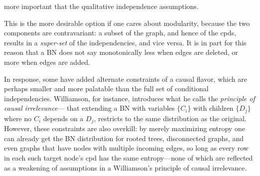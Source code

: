 \documentclass[letterpaper]{article} %
\theoremstyle{plain}
\theoremstyle{definition}
\theoremstyle{remark}
\newcommand{\commentout}[1]{\ignorespaces}
\begin{document}
{        more important that the qualitative independence assumptions.  
\begin{vfull}
	This is the more desirable option if one cares about
	modularity, because the two components are contravariant: a subset of
	the graph, and hence of the cpds, results in a \emph{super-set} of
	the independencies, and vice versa. It is in part for this reason
	that a BN does not say monotonically less when edges are deleted, or
	more when edges are added. 
\end{vfull}

\commentout{
To do without the independence assumptions, one might hope
        that maximizing entropy would recover the conditional
        independencies, as maximizing entropy tends to make things as
        independent as possible given the constraints --- but
        maximizing entropy alone is not enough
        (\Cref{ex:counterexample}).
}
\begin{vfull}	
	In response, some \cite{williamson2001foundations}\cite{holmes2001independence} have added alternate constraints of a causal flavor, which are perhaps smaller and more palatable than the full set of conditional independencies.  Williamson, for instance, introduces what he calls the \emph{principle of causal irrelevance}--- that extending a BN with variables $\{C_i\}$ with children $\{D_j\}$ where no $C_i$ depends on a $D_j$, restricts to the same distribution as the original.  However, these constraints are also overkill: by merely maximizing entropy one can already get the BN distribution for rooted trees, disconnected graphs, and even graphs that have nodes with multiple incoming edges, so long as every row in each such target node's cpd has the same entropy---none of which are reflected as a weakening of assumptions in a Williamson's principle of causal irrelevance.
	

\end{vfull}}
\end{document}
